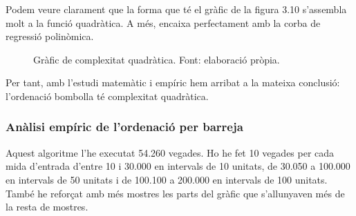 Podem veure clarament que la forma que té el gràfic de la figura 3.10 s'assembla molt a la funció quadràtica. A més, encaixa perfectament amb la corba de regressió polinòmica.

\begin{figure}[H]
    \centering
    \caption[Gràfic de complexitat quadràtica.]{Gràfic de complexitat quadràtica. Font: elaboració pròpia.}
    \label{fig:my_label}
\end{figure}

Per tant, amb l'estudi matemàtic i empíric hem arribat a la mateixa conclusió: l'ordenació bombolla té complexitat quadràtica.

\subsubsection{Anàlisi empíric de l'ordenació per barreja}
Aquest algoritme l'he executat 54.260 vegades. Ho he fet 10 vegades per cada mida d'entrada d'entre 10 i 30.000 en intervals de 10 unitats, de 30.050 a 100.000 en intervals de 50 unitats i de 100.100 a 200.000 en intervals de 100 unitats. També he reforçat amb més mostres les parts del gràfic que s'allunyaven més de la resta de mostres.

